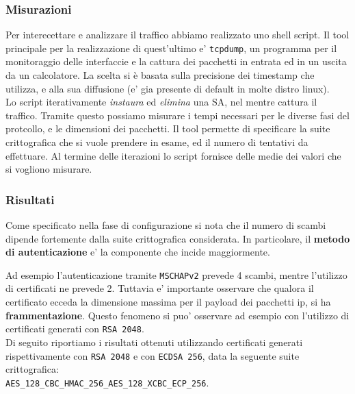 \documentclass[
10pt, %
a4paper, %
oneside, %
headinclude,footinclude, %
BCOR5mm, %
]{scrartcl}
\begin{document}
\subsubsection{Misurazioni}

Per interecettare e analizzare il traffico abbiamo realizzato uno shell script. Il tool principale per la realizzazione di quest'ultimo e' \lstinline|tcpdump|, un programma per il monitoraggio delle interfaccie e la cattura dei pacchetti in entrata ed in un uscita da un calcolatore. 
La scelta si è basata sulla precisione dei timestamp che utilizza, e alla sua diffusione (e' gia presente di default in molte distro linux).
\\ 

\noindent
Lo script iterativamente \textit{instaura} ed \textit{elimina} una SA, nel mentre cattura il traffico. Tramite questo possiamo misurare i tempi necessari per le diverse fasi del protcollo, e le dimensioni dei pacchetti.
Il tool permette di specificare la suite crittografica che si vuole prendere in esame, ed il numero di tentativi da effettuare.
Al termine delle iterazioni lo script fornisce delle medie dei valori che si vogliono misurare.

\subsubsection{Risultati}

Come specificato nella fase di configurazione si nota che il numero di scambi dipende fortemente dalla suite crittografica considerata.
In particolare, il \textbf{metodo di autenticazione} e' la componente che incide maggiormente.

\noindent
Ad esempio l'autenticazione tramite \lstinline|MSCHAPv2| prevede 4 scambi, mentre l'utilizzo di certificati ne prevede 2. 
Tuttavia e' importante osservare che qualora il certificato ecceda la dimensione massima per il payload dei pacchetti ip, si ha \textbf{frammentazione}. 
Questo fenomeno si puo' osservare ad esempio con l'utilizzo di certificati generati con \lstinline|RSA 2048|.
\\

\noindent
Di seguito riportiamo i risultati ottenuti utilizzando certificati generati rispettivamente con \lstinline|RSA 2048| e con \lstinline|ECDSA 256|, data la seguente suite crittografica: \\
\lstinline|AES_128_CBC_HMAC_256_AES_128_XCBC_ECP_256|.
\end{document}
